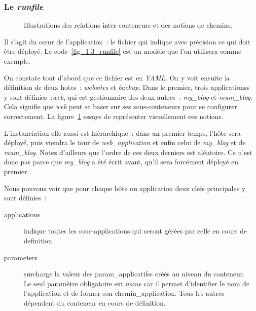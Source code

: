 \subsubsection{Le \emph{runfile}}

\begin{figure}
	\centerfloat
	\caption{Illustrations des relations inter-conteneurs et des notions de chemins.}
	\label{relation_conteneurs}
	
\end{figure}



Il s'agit du cœur de l'application~: le fichier qui indique avec précision ce qui doit être déployé.
Le code~\ref{fig_1.3_runfile} est un modèle que l'on utilisera comme exemple.

On constate tout d'abord que ce fichier est en \emph{YAML}. 
On y voit ensuite la définition de deux \glspl{hote}~: \emph{websites} et \emph{backup}.
Dans le premier, trois \glspl{application}s y sont définies~:\emph{web}, qui est \gls{gestionnaire} des deux autres~: \emph{my\_blog} et \emph{mum\_blog}.
Cela signifie que \emph{web} peut se baser sur ses \glspl{sous-conteneur} pour se configurer correctement.
La figure~\ref{relation_conteneurs} essaye de représenter visuellement ces notions.

L'\gls{instanciation} elle aussi est hiérarchique~: dans un premier temps, l'hôte sera déployé, puis viendra le tour de \emph{web\_application} et enfin celui de \emph{my\_blog} et de \emph{mum\_blog}.
Notez d'ailleurs que l'ordre de ces deux derniers est aléatoire.
Ce n'est donc pas parce que \emph{my\_blog} a été écrit avant, qu'il sera forcément déployé en premier.

Nous pouvons voir que pour chaque hôte ou application deux clefs principales y sont définies~:
\begin{description}
	\item[applications] indique toutes les \glspl{sous-application} qui seront gérées par celle en cours de \gls{definition}.
	\item[parameters] surcharge la valeur des \glspl{param_applicatifs} créés au niveau du conteneur.
		Le seul paramètre obligatoire est \emph{name} car il permet d'identifier le nom de l'application et de former son \gls{chemin_application}.
		Tous les autres dépendent du conteneur en cours de définition.
\end{description}

